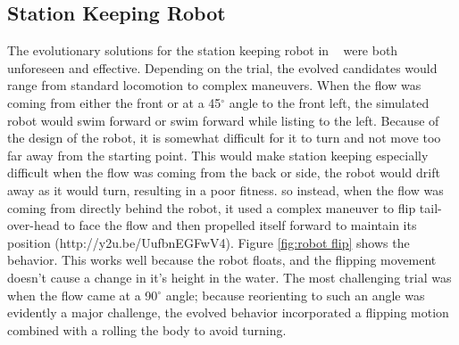 \documentclass{sig-alternate}
\begin{document}
\subsection{Station Keeping Robot}\label{Moore behavior}
  The evolutionary solutions for the station keeping robot in ~\cite{Moore:2013:ESK:2463372.2463402} were both unforeseen and effective. Depending on the trial, the evolved candidates would range from standard locomotion to complex maneuvers. When the flow was coming from either the front or at a 45$^\circ$ angle to the front left, the simulated robot would swim forward or swim forward while listing to the left. Because of the design of the robot, it is somewhat difficult for it to turn and not move too far away from the starting point. This would make station keeping especially difficult when the flow was coming from the back or side, the robot would drift away as it would turn, resulting in a poor fitness. so instead, when the flow was coming from directly behind the robot, it used a complex maneuver to flip tail-over-head to face the flow and then propelled itself forward to maintain its position (http://y2u.be/UufbnEGFwV4). Figure \ref{fig:robot flip} shows the behavior. This works well because the robot floats, and the flipping movement doesn't cause a change in it's height in the water. The most challenging trial was when the flow came at a 90$^\circ$ angle; because reorienting to such an angle was evidently a major challenge, the evolved behavior incorporated a flipping motion combined with a rolling the body to avoid turning.
 
\end{document}
